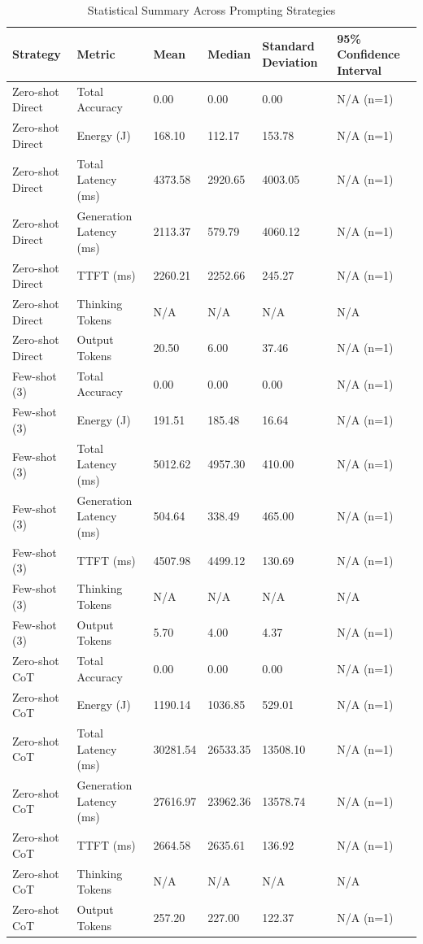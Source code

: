 \begin{table}
\caption{Statistical Summary Across Prompting Strategies}
\label{tab:statistical_summary}
\begin{tabular}{llllll}
\toprule
Strategy & Metric & Mean & Median & Standard Deviation & 95\% Confidence Interval \\
\midrule
Zero-shot Direct & Total Accuracy & 0.00 & 0.00 & 0.00 & N/A (n=1) \\
Zero-shot Direct & Energy (J) & 168.10 & 112.17 & 153.78 & N/A (n=1) \\
Zero-shot Direct & Total Latency (ms) & 4373.58 & 2920.65 & 4003.05 & N/A (n=1) \\
Zero-shot Direct & Generation Latency (ms) & 2113.37 & 579.79 & 4060.12 & N/A (n=1) \\
Zero-shot Direct & TTFT (ms) & 2260.21 & 2252.66 & 245.27 & N/A (n=1) \\
Zero-shot Direct & Thinking Tokens & N/A & N/A & N/A & N/A \\
Zero-shot Direct & Output Tokens & 20.50 & 6.00 & 37.46 & N/A (n=1) \\
Few-shot (3) & Total Accuracy & 0.00 & 0.00 & 0.00 & N/A (n=1) \\
Few-shot (3) & Energy (J) & 191.51 & 185.48 & 16.64 & N/A (n=1) \\
Few-shot (3) & Total Latency (ms) & 5012.62 & 4957.30 & 410.00 & N/A (n=1) \\
Few-shot (3) & Generation Latency (ms) & 504.64 & 338.49 & 465.00 & N/A (n=1) \\
Few-shot (3) & TTFT (ms) & 4507.98 & 4499.12 & 130.69 & N/A (n=1) \\
Few-shot (3) & Thinking Tokens & N/A & N/A & N/A & N/A \\
Few-shot (3) & Output Tokens & 5.70 & 4.00 & 4.37 & N/A (n=1) \\
Zero-shot CoT & Total Accuracy & 0.00 & 0.00 & 0.00 & N/A (n=1) \\
Zero-shot CoT & Energy (J) & 1190.14 & 1036.85 & 529.01 & N/A (n=1) \\
Zero-shot CoT & Total Latency (ms) & 30281.54 & 26533.35 & 13508.10 & N/A (n=1) \\
Zero-shot CoT & Generation Latency (ms) & 27616.97 & 23962.36 & 13578.74 & N/A (n=1) \\
Zero-shot CoT & TTFT (ms) & 2664.58 & 2635.61 & 136.92 & N/A (n=1) \\
Zero-shot CoT & Thinking Tokens & N/A & N/A & N/A & N/A \\
Zero-shot CoT & Output Tokens & 257.20 & 227.00 & 122.37 & N/A (n=1) \\

\end{tabular}
\end{table}
